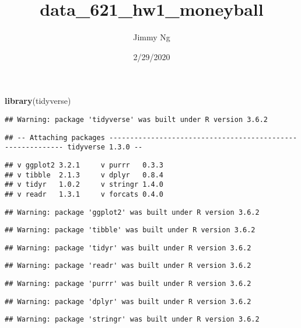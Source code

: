 \documentclass[
]{article}
\title{data\_621\_hw1\_moneyball}
\author{Jimmy Ng}
\date{2/29/2020}
\newenvironment{Shaded}{\begin{snugshade}}{\end{snugshade}}
\newcommand{\KeywordTok}[1]{\textcolor[rgb]{0.13,0.29,0.53}{\textbf{#1}}}
\newcommand{\NormalTok}[1]{#1}
\begin{document}
\maketitle

\begin{Shaded}
\begin{Highlighting}[]
\KeywordTok{library}\NormalTok{(tidyverse)}
\end{Highlighting}
\end{Shaded}

\begin{verbatim}
## Warning: package 'tidyverse' was built under R version 3.6.2
\end{verbatim}

\begin{verbatim}
## -- Attaching packages ----------------------------------------------------------- tidyverse 1.3.0 --
\end{verbatim}

\begin{verbatim}
## v ggplot2 3.2.1     v purrr   0.3.3
## v tibble  2.1.3     v dplyr   0.8.4
## v tidyr   1.0.2     v stringr 1.4.0
## v readr   1.3.1     v forcats 0.4.0
\end{verbatim}

\begin{verbatim}
## Warning: package 'ggplot2' was built under R version 3.6.2
\end{verbatim}

\begin{verbatim}
## Warning: package 'tibble' was built under R version 3.6.2
\end{verbatim}

\begin{verbatim}
## Warning: package 'tidyr' was built under R version 3.6.2
\end{verbatim}

\begin{verbatim}
## Warning: package 'readr' was built under R version 3.6.2
\end{verbatim}

\begin{verbatim}
## Warning: package 'purrr' was built under R version 3.6.2
\end{verbatim}

\begin{verbatim}
## Warning: package 'dplyr' was built under R version 3.6.2
\end{verbatim}

\begin{verbatim}
## Warning: package 'stringr' was built under R version 3.6.2
\end{verbatim}
\end{document}
